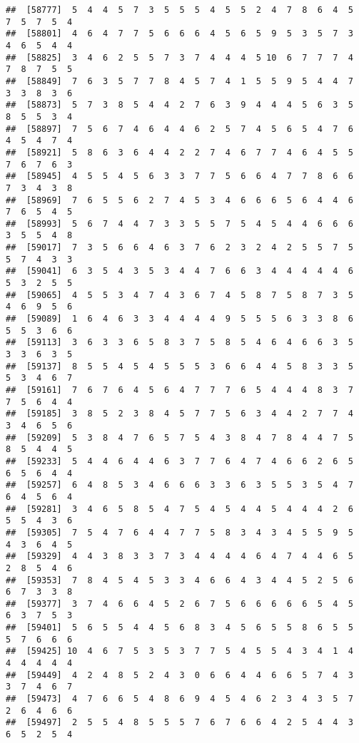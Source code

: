 \documentclass[
]{book}
\begin{document}
\begin{verbatim}
##  [58777]  5  4  4  5  7  3  5  5  5  4  5  5  2  4  7  8  6  4  5  7  5  7  5  4
##  [58801]  4  6  4  7  7  5  6  6  6  4  5  6  5  9  5  3  5  7  3  4  6  5  4  4
##  [58825]  3  4  6  2  5  5  7  3  7  4  4  4  5 10  6  7  7  7  4  7  8  7  5  5
##  [58849]  7  6  3  5  7  7  8  4  5  7  4  1  5  5  9  5  4  4  7  3  3  8  3  6
##  [58873]  5  7  3  8  5  4  4  2  7  6  3  9  4  4  4  5  6  3  5  8  5  5  3  4
##  [58897]  7  5  6  7  4  6  4  4  6  2  5  7  4  5  6  5  4  7  6  4  5  4  7  4
##  [58921]  5  8  6  3  6  4  4  2  2  7  4  6  7  7  4  6  4  5  5  7  6  7  6  3
##  [58945]  4  5  5  4  5  6  3  3  7  7  5  6  6  4  7  7  8  6  6  7  3  4  3  8
##  [58969]  7  6  5  5  6  2  7  4  5  3  4  6  6  6  5  6  4  4  6  7  6  5  4  5
##  [58993]  5  6  7  4  4  7  3  3  5  5  7  5  4  5  4  4  6  6  6  3  5  5  4  8
##  [59017]  7  3  5  6  6  4  6  3  7  6  2  3  2  4  2  5  5  7  5  5  7  4  3  3
##  [59041]  6  3  5  4  3  5  3  4  4  7  6  6  3  4  4  4  4  4  6  5  3  2  5  5
##  [59065]  4  5  5  3  4  7  4  3  6  7  4  5  8  7  5  8  7  3  5  4  6  9  5  6
##  [59089]  1  6  4  6  3  3  4  4  4  4  9  5  5  5  6  3  3  8  6  5  5  3  6  6
##  [59113]  3  6  3  3  6  5  8  3  7  5  8  5  4  6  4  6  6  3  5  3  3  6  3  5
##  [59137]  8  5  5  4  5  4  5  5  5  3  6  6  4  4  5  8  3  3  5  5  3  4  6  7
##  [59161]  7  6  7  6  4  5  6  4  7  7  7  6  5  4  4  4  8  3  7  7  5  6  4  4
##  [59185]  3  8  5  2  3  8  4  5  7  7  5  6  3  4  4  2  7  7  4  3  4  6  5  6
##  [59209]  5  3  8  4  7  6  5  7  5  4  3  8  4  7  8  4  4  7  5  8  5  4  4  5
##  [59233]  5  4  4  6  4  4  6  3  7  7  6  4  7  4  6  6  2  6  5  6  5  6  4  4
##  [59257]  6  4  8  5  3  4  6  6  6  3  3  6  3  5  5  3  5  4  7  6  4  5  6  4
##  [59281]  3  4  6  5  8  5  4  7  5  4  5  4  4  5  4  4  4  2  6  5  5  4  3  6
##  [59305]  7  5  4  7  6  4  4  7  7  5  8  3  4  3  4  5  5  9  5  4  3  6  4  5
##  [59329]  4  4  3  8  3  3  7  3  4  4  4  4  6  4  7  4  4  6  5  2  8  5  4  6
##  [59353]  7  8  4  5  4  5  3  3  4  6  6  4  3  4  4  5  2  5  6  6  7  3  3  8
##  [59377]  3  7  4  6  6  4  5  2  6  7  5  6  6  6  6  6  5  4  5  6  3  7  5  3
##  [59401]  5  6  5  5  4  4  5  6  8  3  4  5  6  5  5  8  6  5  5  5  7  6  6  6
##  [59425] 10  4  6  7  5  3  5  3  7  7  5  4  5  5  4  3  4  1  4  4  4  4  4  4
##  [59449]  4  2  4  8  5  2  4  3  0  6  6  4  4  6  6  5  7  4  3  3  7  4  6  7
##  [59473]  4  7  6  6  5  4  8  6  9  4  5  4  6  2  3  4  3  5  7  2  6  4  6  6
##  [59497]  2  5  5  4  8  5  5  5  7  6  7  6  6  4  2  5  4  4  3  6  5  2  5  4

\end{verbatim}
\end{document}
